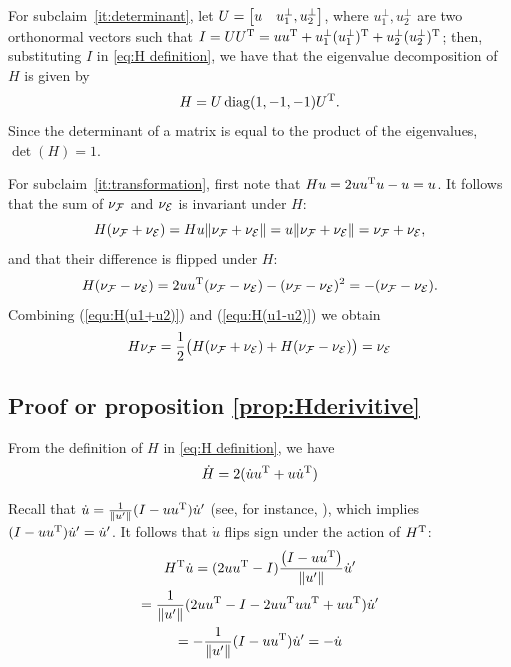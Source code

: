 \documentclass[journal]{IEEEtran}  %
\begin{document}
    For subclaim~\ref{it:determinant}, let $U=\begin{bmatrix}u & u^\bot_{1},u^\bot_{2}\end{bmatrix}$, where $u^\bot_{1},u^\bot_{2}$ are two orthonormal vectors such that $I=UU^\mathrm{T}=uu^\mathrm{T} + u^\bot_{1}(u^\bot_{1})^\mathrm{T}+u^\bot_{2}(u^\bot_{2})^\mathrm{T}$; then, substituting $I$ in \eqref{eq:H definition}, we have that the eigenvalue decomposition of $H$ is given by
    \begin{equation}
      H=U\operatorname{diag}(1,-1,-1) U^\mathrm{T}.
    \end{equation}
    Since the determinant of a matrix is equal to the product of the eigenvalues, $\det(H)=1$.

    For subclaim~\ref{it:transformation}, first note that $Hu=2uu^\mathrm{T} u - u=u$.
    It follows that the sum of $\nu_{\mathcal{F}}$ and $\nu_{\mathcal{E}}$ is invariant under $H$:
    \begin{equation}\label{equ:H(u1+u2)}
      H(\nu_{\mathcal{F}}+\nu_{\mathcal{E}})=H u \lVert\nu_{\mathcal{F}}+\nu_{\mathcal{E}}\rVert
      = u\lVert\nu_{\mathcal{F}}+\nu_{\mathcal{E}}\rVert =\nu_{\mathcal{F}}+\nu_{\mathcal{E}},
    \end{equation}
    and that their difference is flipped under $H$:
    \begin{equation}\label{equ:H(u1-u2)}
      H(\nu_{\mathcal{F}}-\nu_{\mathcal{E}}) = 2uu^\mathrm{T} (\nu_{\mathcal{F}}-\nu_{\mathcal{E}}) - (\nu_{\mathcal{F}}-\nu_{\mathcal{E}})^2 = -(\nu_{\mathcal{F}}-\nu_{\mathcal{E}}).
    \end{equation}
    Combining (\ref{equ:H(u1+u2)}) and (\ref{equ:H(u1-u2)}) we obtain
    \begin{equation}
      H\nu_{\mathcal{F}} = \frac{1}{2}\bigl(H(\nu_{\mathcal{F}}+\nu_{\mathcal{E}})+H(\nu_{\mathcal{F}}-\nu_{\mathcal{E}})\bigr)
      = \nu_{\mathcal{E}}
    \end{equation}

\subsection{Proof or proposition \ref{prop:Hderivitive}} \label{proof:Hderivitive}
    From the definition of $H$ in \eqref{eq:H definition}, we have
    \begin{equation} \label{equ:H_dot original}
      \dot H =   2(\dot u u^\mathrm{T} + u \dot u^\mathrm{T})
    \end{equation}

    Recall that $\dot{u}=\frac{1}{\lVert u'\rVert}(I-uu^\mathrm{T})\dot{u}'$ (see, for instance, \cite{Tron:Arxiv14}), which implies $(I-uu^\mathrm{T})\dot{u}'=\dot{u}'$. It follows that $\dot{u}$ flips sign under the action of $H^\mathrm{T}$:
    \begin{multline}
      H^\mathrm{T} \dot u = (2u u^\mathrm{T}-I)\frac{ \left( I - u u^\mathrm{T} \right) } {\left\|u'\right\|} \dot u' \\
      =\frac{1}{\lVert u'\rVert} (2u u^\mathrm{T}-I-2u u^\mathrm{T} u u^\mathrm{T}+u u^\mathrm{T})\dot{u}'\\
      = -\frac{1}{\lVert u'\rVert} (I-u u^\mathrm{T})\dot u'
      = -\dot u
    \end{multline}
\end{document}
